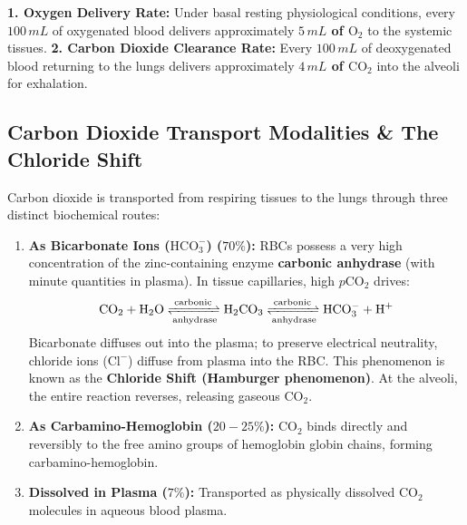 \documentclass[10pt,twoside,openright]{book}
\begin{document}
\begin{formulabox}
\textbf{1. Oxygen Delivery Rate:}
Under basal resting physiological conditions, every $100\,\si{mL}$ of oxygenated blood delivers approximately \textbf{$5\,\si{mL}$ of $\mathrm{O_2}$} to the systemic tissues.
\textbf{2. Carbon Dioxide Clearance Rate:}
Every $100\,\si{mL}$ of deoxygenated blood returning to the lungs delivers approximately \textbf{$4\,\si{mL}$ of $\mathrm{CO_2}$} into the alveoli for exhalation.
\end{formulabox}

\subsection{Carbon Dioxide Transport Modalities \& The Chloride Shift}
Carbon dioxide is transported from respiring tissues to the lungs through three distinct biochemical routes:
\begin{enumerate}
  \item \textbf{As Bicarbonate Ions ($\mathrm{HCO}_3^-$) ($70\%$):} RBCs possess a very high concentration of the zinc-containing enzyme \textbf{carbonic anhydrase} (with minute quantities in plasma). In tissue capillaries, high $p\mathrm{CO_2}$ drives:
  \begin{equation}
    \mathrm{CO_2 + H_2O} \xrightleftharpoons[\text{anhydrase}]{\text{carbonic}} \mathrm{H_2CO_3} \xrightleftharpoons[\text{anhydrase}]{\text{carbonic}} \mathrm{HCO_3^- + H^+}
  \end{equation}
  Bicarbonate diffuses out into the plasma; to preserve electrical neutrality, chloride ions ($\mathrm{Cl}^-$) diffuse from plasma into the RBC. This phenomenon is known as the \textbf{Chloride Shift (Hamburger phenomenon)}. At the alveoli, the entire reaction reverses, releasing gaseous $\mathrm{CO_2}$.
  \item \textbf{As Carbamino-Hemoglobin ($20-25\%$):} $\mathrm{CO}_2$ binds directly and reversibly to the free amino groups of hemoglobin globin chains, forming carbamino-hemoglobin.
  \item \textbf{Dissolved in Plasma ($7\%$):} Transported as physically dissolved $\mathrm{CO_2}$ molecules in aqueous blood plasma.
\end{enumerate}
\end{document}
